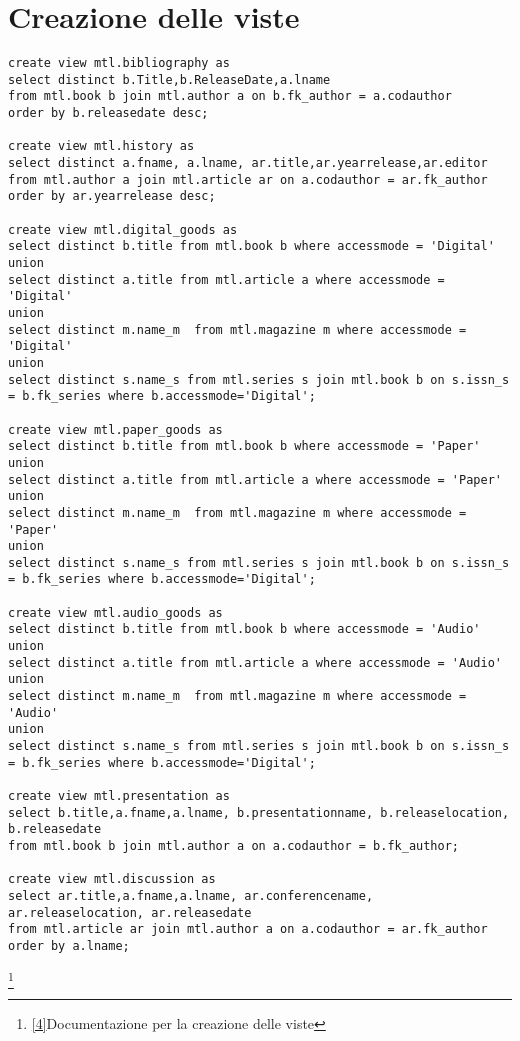 \section{Creazione delle viste}
\begin{lstlisting}
create view mtl.bibliography as
select distinct b.Title,b.ReleaseDate,a.lname
from mtl.book b join mtl.author a on b.fk_author = a.codauthor
order by b.releasedate desc;

create view mtl.history as
select distinct a.fname, a.lname, ar.title,ar.yearrelease,ar.editor
from mtl.author a join mtl.article ar on a.codauthor = ar.fk_author
order by ar.yearrelease desc;

create view mtl.digital_goods as
select distinct b.title from mtl.book b where accessmode = 'Digital'
union
select distinct a.title from mtl.article a where accessmode = 'Digital'
union
select distinct m.name_m  from mtl.magazine m where accessmode = 'Digital'
union
select distinct s.name_s from mtl.series s join mtl.book b on s.issn_s = b.fk_series where b.accessmode='Digital';

create view mtl.paper_goods as
select distinct b.title from mtl.book b where accessmode = 'Paper'
union
select distinct a.title from mtl.article a where accessmode = 'Paper'
union
select distinct m.name_m  from mtl.magazine m where accessmode = 'Paper'
union
select distinct s.name_s from mtl.series s join mtl.book b on s.issn_s = b.fk_series where b.accessmode='Digital';

create view mtl.audio_goods as
select distinct b.title from mtl.book b where accessmode = 'Audio'
union
select distinct a.title from mtl.article a where accessmode = 'Audio'
union
select distinct m.name_m  from mtl.magazine m where accessmode = 'Audio'
union
select distinct s.name_s from mtl.series s join mtl.book b on s.issn_s = b.fk_series where b.accessmode='Digital';

create view mtl.presentation as
select b.title,a.fname,a.lname, b.presentationname, b.releaselocation, b.releasedate
from mtl.book b join mtl.author a on a.codauthor = b.fk_author;

create view mtl.discussion as
select ar.title,a.fname,a.lname, ar.conferencename, ar.releaselocation, ar.releasedate
from mtl.article ar join mtl.author a on a.codauthor = ar.fk_author
order by a.lname;
\end{lstlisting}
\footnote{\href{https://github.com/lorenzotecchia/ProgettoOOBD/blob/main/BD/Documentazione/DocumentazioneCodiceSQL.md#documentazione-del-file-viewssql}{[4]}Documentazione per la creazione delle viste}
